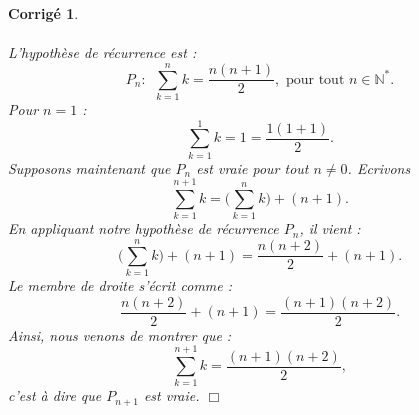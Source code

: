 \documentclass[11pt,french,table]{article}
\theoremstyle{exercice}
\theoremstyle{corrigé}
\newtheorem{corrigé}{Corrigé}
\begin{document}
\begin{corrigé}
       \paragraph{}
       L’hypothèse de récurrence est :
       \begin{equation*}
           P_n : \ \ \sum_{k=1}^{n}k=\displaystyle\frac{n(n+1)}{2}, \text{ pour tout } n\in \mathbb{N}^*.
       \end{equation*}
Pour $n=1$ : 
\begin{equation*}
    \sum_{k=1}^{1}k=1=\displaystyle\frac{1(1+1)}{2}.
\end{equation*}
Supposons maintenant que $P_n$ est vraie pour tout $n\neq0$. Ecrivons 
\begin{equation*}
    \sum_{k=1}^{n+1}k=\bigg(\sum_{k=1}^{n}k\bigg)+(n+1). 
\end{equation*}
En appliquant notre hypothèse de récurrence $P_n$, il vient : 
\begin{equation*}
    \bigg(\sum_{k=1}^{n}k\bigg)+(n+1)=\frac{n(n+2)}{2}+(n+1).
\end{equation*}
Le membre de droite s'écrit comme : 
\begin{equation*}
    \frac{n(n+2)}{2}+(n+1)=\frac{(n+1)(n+2)}{2}. 
\end{equation*}
Ainsi, nous venons de montrer que : 
\begin{equation*}
    \sum_{k=1}^{n+1}k=\displaystyle\frac{(n+1)(n+2)}{2}, 
\end{equation*}
c'est à dire que $P_{n+1}$ est vraie. \flushright $\Box$
\flushleft
  
\end{corrigé}
\end{document}
